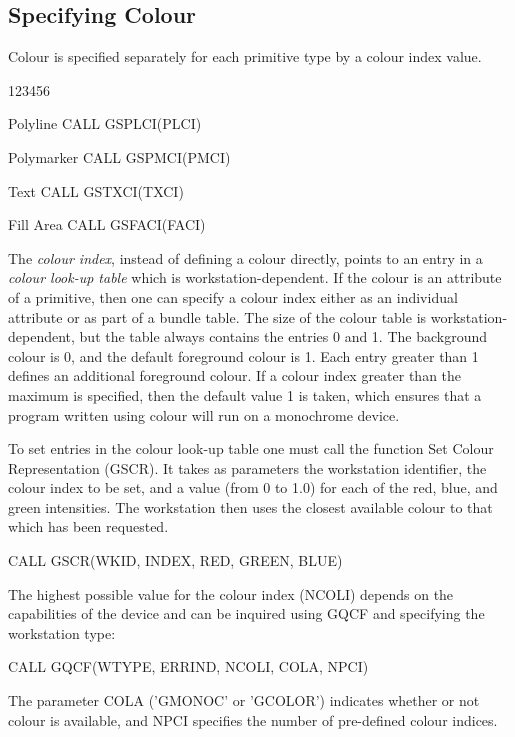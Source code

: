 \subsection{Specifying Colour}
 
Colour is specified separately for each primitive type by a colour index value.
\begin{DLtt}{123456}
\item[Polyline]CALL GSPLCI(PLCI)
\item[Polymarker]CALL GSPMCI(PMCI)
\item[Text]CALL GSTXCI(TXCI)
\item[Fill Area]CALL GSFACI(FACI)
\end{DLtt}
The {\it colour index}, instead of defining a colour directly, points to
an entry in a {\it colour look-up table} which is workstation-dependent.
If the colour is an attribute of a primitive, then one can specify a colour
index either as an individual attribute or as part of a bundle table.
The size of the colour table is workstation-dependent, but
the table always contains the entries 0 and 1.
The background colour is 0, and the default foreground colour is 1.
Each entry greater than 1 defines an additional foreground colour.
If a colour index greater than the maximum is
specified, then the default value 1 is taken, which ensures that a program
written using colour will run on a monochrome device.
 
To set entries in the colour look-up table
one must call the function Set Colour Representation (GSCR).
It takes as parameters the workstation identifier, the colour index
to be set, and a value (from 0 to 1.0) for each of the red, blue, and green
intensities. The workstation then uses the closest available
colour to that which has been requested.
\begin{XMP}
CALL GSCR(WKID, INDEX, RED, GREEN, BLUE)
\end{XMP}
 
The highest possible value for the colour index (NCOLI)
depends on the capabilities of the device and can be inquired using
GQCF and specifying the workstation type:
\begin{XMP}
CALL GQCF(WTYPE, ERRIND, NCOLI, COLA, NPCI)
\end{XMP}
The parameter COLA ('GMONOC' or 'GCOLOR') indicates whether or not colour
is available, and NPCI specifies the number of pre-defined colour indices.
 
